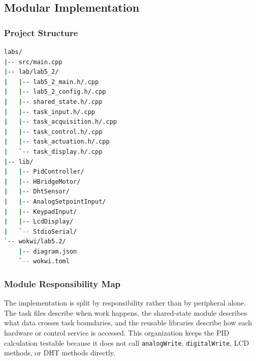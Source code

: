 \subsection{Modular Implementation}

\subsubsection{Project Structure}

\begin{lstlisting}[language=bash, caption=Lab 5.2 source tree, label=lst:project_structure]
labs/
|-- src/main.cpp
|-- lab/lab5_2/
|   |-- lab5_2_main.h/.cpp
|   |-- lab5_2_config.h/.cpp
|   |-- shared_state.h/.cpp
|   |-- task_input.h/.cpp
|   |-- task_acquisition.h/.cpp
|   |-- task_control.h/.cpp
|   |-- task_actuation.h/.cpp
|   `-- task_display.h/.cpp
|-- lib/
|   |-- PidController/
|   |-- HBridgeMotor/
|   |-- DhtSensor/
|   |-- AnalogSetpointInput/
|   |-- KeypadInput/
|   |-- LcdDisplay/
|   `-- StdioSerial/
`-- wokwi/lab5.2/
    |-- diagram.json
    `-- wokwi.toml
\end{lstlisting}

\subsubsection{Module Responsibility Map}

The implementation is split by responsibility rather than by peripheral alone. The task files describe when work happens, the shared-state module describes what data crosses task boundaries, and the reusable libraries describe how each hardware or control service is accessed. This organization keeps the PID calculation testable because it does not call \texttt{analogWrite}, \texttt{digitalWrite}, LCD methods, or DHT methods directly.

